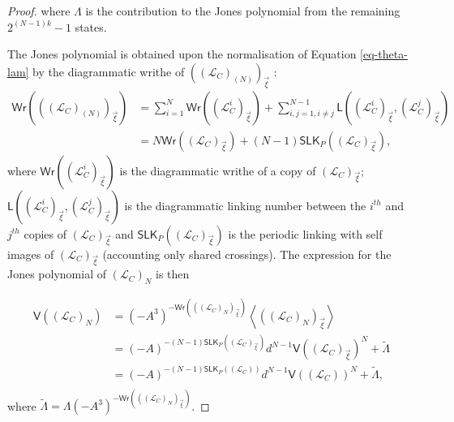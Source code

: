 \documentclass[10pt,a4paper]{amsart}
\begin{document}
\begin{proof}
\noindent where $\Lambda$ is the contribution to the Jones polynomial from the remaining $2^{(N-1)k}-1$ states.

The Jones polynomial is obtained upon the normalisation of Equation \ref{eq-theta-lam} by the diagrammatic writhe of $ {((\mathcal{L}_C)_{(N)})}_{\vec{\xi}}$ :
\begin{equation}
\begin{split}\displaystyle \mathsf{Wr}\left({((\mathcal{L}_C)_{(N)})}_{\vec{\xi}}\right) &= \sum_{i=1}^{N} \mathsf{Wr}\left((\mathcal{L}_C^i)_{\vec{\xi}}\right) + \sum_{i,j=1, i\neq j}^{N-1} \mathsf{L}\left((\mathcal{L}_C^i)_{\vec{\xi}},(\mathcal{L}_C^{j})_{\vec{\xi}}\right)\\&= N \mathsf{Wr}\left({(\mathcal{L}_C)}_{\vec{\xi}}\right) + (N-1) \mathsf{SLK}_P\left({(\mathcal{L}_C)}_{\vec{\xi}}\right),
\end{split}
\label{wrr1}
\end{equation}
where $\mathsf{Wr}\left({(\mathcal{L}_C^i)}_{\vec{\xi}}\right)$ is the diagrammatic writhe of a copy of ${(\mathcal{L}_C)}_{\vec{\xi}}$; $\mathsf{L}\left((\mathcal{L}_C^i)_{\vec{\xi}},(\mathcal{L}_C^{j})_{\vec{\xi}}\right)$ is the diagrammatic linking number between the $i^{th}$ and $j^{th}$ copies of ${(\mathcal{L}_C)}_{\vec{\xi}}$ and $\mathsf{SLK}_P\left({(\mathcal{L}_C)}_{\vec{\xi}}\right)$ is the periodic linking  with self images of ${(\mathcal{L}_C)}_{\vec{\xi}}$ (accounting only shared crossings). The expression for the Jones polynomial of $(\mathcal{L}_C)_{N}$ is then 

\begin{equation}
    \begin{split}\displaystyle
        \mathsf{V}\left((\mathcal{L}_C)_{N}\right) &= {(-A^3)}^{-\mathsf{Wr}\left({((\mathcal{L}_C)_{N})}_{\vec{\xi}}\right)} \left\langle {((\mathcal{L}_C)_{N})}_{\vec{\xi}} \right\rangle\\
         &=(-A)^{-(N-1)\mathsf{SLK}_P\left({(\mathcal{L}_C)}_{\vec{\xi}}\right)} d^{N-1} {\mathsf{V}\left({(\mathcal{L}_C)}_{\vec{\xi}}\right)}^N + \tilde{\Lambda}\\
        &=(-A)^{-(N-1)\mathsf{SLK}_P\left({(\mathcal{L}_C)}\right)} d^{N-1} {\mathsf{V}\left({(\mathcal{L}_C)}\right)}^N + \tilde{\Lambda},\\
    \end{split}
\end{equation}
where $\displaystyle \tilde{\Lambda} = \Lambda {(-A^3)}^{-\mathsf{Wr}\left({((\mathcal{L}_C)_{N})}_{\vec{\xi}}\right)}$. 
\end{proof}
\end{document}

